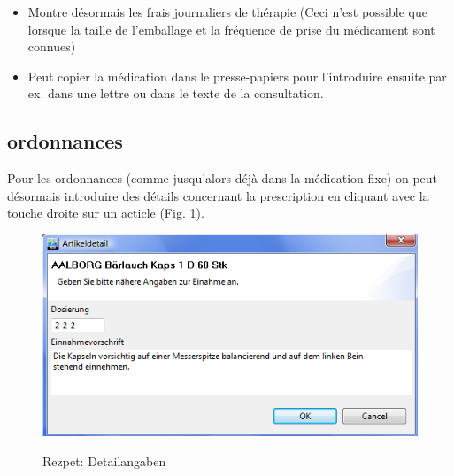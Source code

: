 \documentclass[a4paper]{scrartcl}
\begin{document}
\begin{itemize}
\item Montre désormais les frais journaliers de thérapie (Ceci n'est possible que lorsque la taille de l'emballage et la fréquence de prise du médicament sont connues) 
\item Peut copier la médication dans le presse-papiers pour l'introduire ensuite par ex. dans une lettre ou dans le texte de la consultation.
\end{itemize}

\subsection{ordonnances}
Pour les ordonnances (comme jusqu'alors déjà dans la médication fixe) on peut désormais introduire des détails concernant la prescription en cliquant avec la touche droite sur un acticle (Fig. \ref{fig:einnahme1}).
\begin{figure}
  \includegraphics{einnahme1}\\
  \caption{Rezpet: Detailangaben}\label{fig:einnahme1}
\end{figure}
\end{document}
